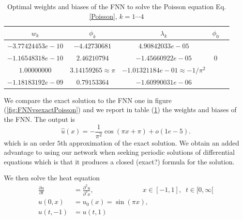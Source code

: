 \documentclass[AMS,STIX1COL]{WileyNJD-v2}
\begin{document}
 \begin{table}[!h]
  \begin{center}
\begin{tabular}{ |c|c|c|c|c| } 
\hline
$w_k$ & $\phi_k$ & $\lambda_k$& $\phi_0$ \\
\hline
$-3.77424453e-10$ & $-4.42730681$ &$4.90842033e-05$& \\ 
$-1.16548318e-10$&$ 2.46210794$ & $-1.45660922e-05$& $0$ \\ 
$1.00000000$& $ 3.14159265 \approx \pi$ & $-1.01321184e-01 \approx -1/\pi^2$& \\ 
$ -1.18183192e-09$& $ 0.79153364 $ & $-1.60990031e-06$& \\ 
\hline
\end{tabular}
\caption{Optimal weights and biases of the FNN to solve the Poisson equation Eq. \ref{Poisson}, $k = 1\cdots4$ }\label{tabPoisson}
\end{center}
\end{table}


We compare the exact solution to the FNN one in figure (\ref{fig:FNNvsexactPoisson}) and we report in table (\ref{tabPoisson}) the weights and biases of the FNN. The output is 
$$\hat{u}(x) = -\frac{1}{\pi^2}\cos(\pi x + \pi) + o(1e-5).$$
which is an order $5$th approximation of the exact solution. We obtain an added advantage to using our network when seeking periodic solutions of differential equations which is that it produces a closed (exact?) formula for the solution.

We then solve the heat equation 
\begin{align}\label{Heat}
    \frac{\partial u}{\partial t} &= \frac{\partial^2 u}{\partial^2 x},\;\;\;\;\;\;\;\;\;\;\;\;\;\;\;\;\;\;\;\;\;\;\;\;\; \;x \in [-1,1], \; \;t \in [0,\infty[ \nonumber \\
    u(0,x) &= u_0(x) = \sin(\pi x),\\
    u(t, -1) &= u(t, 1) \nonumber
\end{align}
\end{document}
